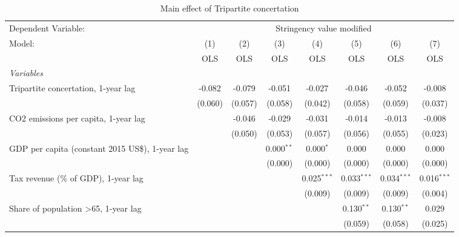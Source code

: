 
\begin{table}[htbp]
   \caption{Main effect of Tripartite concertation}
   \centering
   \begin{tabular}{lccccccc}
      \toprule
      Dependent Variable: & \multicolumn{7}{c}{Stringency value modified}\\
      Model:                                                & (1)     & (2)     & (3)          & (4)           & (5)           & (6)           & (7)\\  
                                                            &  OLS    & OLS     & OLS          & OLS           & OLS           & OLS           & OLS\\  
      \midrule
      \emph{Variables}\\
      Tripartite concertation, 1-year lag                   & -0.082  & -0.079  & -0.051       & -0.027        & -0.046        & -0.052        & -0.008\\   
                                                            & (0.060) & (0.057) & (0.058)      & (0.042)       & (0.058)       & (0.059)       & (0.037)\\   
      CO2 emissions per capita, 1-year lag                  &         & -0.046  & -0.029       & -0.031        & -0.014        & -0.013        & -0.008\\   
                                                            &         & (0.050) & (0.053)      & (0.057)       & (0.056)       & (0.055)       & (0.023)\\   
      GDP per capita (constant 2015 US\$), 1-year lag       &         &         & 0.000$^{**}$ & 0.000$^{*}$   & 0.000         & 0.000         & 0.000\\   
                                                            &         &         & (0.000)      & (0.000)       & (0.000)       & (0.000)       & (0.000)\\   
      Tax revenue (\% of GDP), 1-year lag                   &         &         &              & 0.025$^{***}$ & 0.033$^{***}$ & 0.034$^{***}$ & 0.016$^{***}$\\   
                                                            &         &         &              & (0.009)       & (0.009)       & (0.009)       & (0.004)\\   
      Share of population >65, 1-year lag                   &         &         &              &               & 0.130$^{**}$  & 0.130$^{**}$  & 0.029\\   
                                                            &         &         &              &               & (0.059)       & (0.058)       & (0.025)\\   

\end{tabular}
\end{table}
